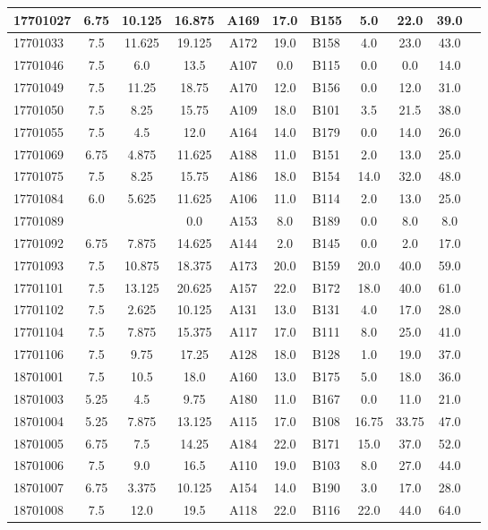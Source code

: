 \documentclass[12pt]{article}
\begin{document}
\begin{center}
\begin{small}
\begin{tabular}{|l|c|c|c|c|c|c|c|c|c|c|}
17701027 & 6.75 & 10.125 & 16.875 & A169 & 17.0 & B155 & 5.0 & 22.0 & 39.0\\ \hline 
17701033 & 7.5 & 11.625 & 19.125 & A172 & 19.0 & B158 & 4.0 & 23.0 & 43.0\\ \hline 
17701046 & 7.5 & 6.0 & 13.5 & A107 & 0.0 & B115 & 0.0 & 0.0 & 14.0\\ \hline 
17701049 & 7.5 & 11.25 & 18.75 & A170 & 12.0 & B156 & 0.0 & 12.0 & 31.0\\ \hline 
17701050 & 7.5 & 8.25 & 15.75 & A109 & 18.0 & B101 & 3.5 & 21.5 & 38.0\\ \hline 
17701055 & 7.5 & 4.5 & 12.0 & A164 & 14.0 & B179 & 0.0 & 14.0 & 26.0\\ \hline 
17701069 & 6.75 & 4.875 & 11.625 & A188 & 11.0 & B151 & 2.0 & 13.0 & 25.0\\ \hline 
17701075 & 7.5 & 8.25 & 15.75 & A186 & 18.0 & B154 & 14.0 & 32.0 & 48.0\\ \hline 
17701084 & 6.0 & 5.625 & 11.625 & A106 & 11.0 & B114 & 2.0 & 13.0 & 25.0\\ \hline 
17701089 &  &  & 0.0 & A153 & 8.0 & B189 & 0.0 & 8.0 & 8.0\\ \hline 
17701092 & 6.75 & 7.875 & 14.625 & A144 & 2.0 & B145 & 0.0 & 2.0 & 17.0\\ \hline 
17701093 & 7.5 & 10.875 & 18.375 & A173 & 20.0 & B159 & 20.0 & 40.0 & 59.0\\ \hline 
17701101 & 7.5 & 13.125 & 20.625 & A157 & 22.0 & B172 & 18.0 & 40.0 & 61.0\\ \hline 
17701102 & 7.5 & 2.625 & 10.125 & A131 & 13.0 & B131 & 4.0 & 17.0 & 28.0\\ \hline 
17701104 & 7.5 & 7.875 & 15.375 & A117 & 17.0 & B111 & 8.0 & 25.0 & 41.0\\ \hline 
17701106 & 7.5 & 9.75 & 17.25 & A128 & 18.0 & B128 & 1.0 & 19.0 & 37.0\\ \hline 
18701001 & 7.5 & 10.5 & 18.0 & A160 & 13.0 & B175 & 5.0 & 18.0 & 36.0\\ \hline 
18701003 & 5.25 & 4.5 & 9.75 & A180 & 11.0 & B167 & 0.0 & 11.0 & 21.0\\ \hline 
18701004 & 5.25 & 7.875 & 13.125 & A115 & 17.0 & B108 & 16.75 & 33.75 & 47.0\\ \hline 
18701005 & 6.75 & 7.5 & 14.25 & A184 & 22.0 & B171 & 15.0 & 37.0 & 52.0\\ \hline 
18701006 & 7.5 & 9.0 & 16.5 & A110 & 19.0 & B103 & 8.0 & 27.0 & 44.0\\ \hline 
18701007 & 6.75 & 3.375 & 10.125 & A154 & 14.0 & B190 & 3.0 & 17.0 & 28.0\\ \hline 
18701008 & 7.5 & 12.0 & 19.5 & A118 & 22.0 & B116 & 22.0 & 44.0 & 64.0\\ \hline 
        \end{tabular}
            \end{small}
            \end{center}
  \centering
            
\end{document}

